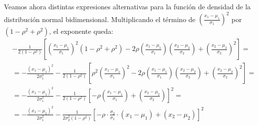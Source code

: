 Veamos ahora distintas expresiones alternativas para la función de densidad de la distribución normal bidimensional.
Multiplicando el término de $\left(\frac{x_1-\mu_1}{\sigma_1}\right)^2$ por $(1-\rho^2+\rho^2)$, el exponente queda:
\begin{align*}
    &-\frac{1}{2(1-\rho^2)}\left[\left(\frac{x_1-\mu_1}{\sigma_1}\right)^2(1-\rho^2+\rho^2)-2\rho\left(\frac{x_1-\mu_1}{\sigma_1}\right)\left(\frac{x_2-\mu_2}{\sigma_2}\right)+\left(\frac{x_2-\mu_2}{\sigma_2}\right)^2\right]
    =\\&= -\frac{\left(x_1-\mu_1\right)^2}{2\sigma_1^2}-\frac{1}{2(1-\rho^2)}\left[\rho^2\left(\frac{x_1-\mu_1}{\sigma_1}\right)^2-2\rho\left(\frac{x_1-\mu_1}{\sigma_1}\right)\left(\frac{x_2-\mu_2}{\sigma_2}\right)+\left(\frac{x_2-\mu_2}{\sigma_2}\right)^2\right]
    =\\&= -\frac{\left(x_1-\mu_1\right)^2}{2\sigma_1^2}-\frac{1}{2(1-\rho^2)}\left[-\rho\left(\frac{x_1-\mu_1}{\sigma_1}\right)+\left(\frac{x_2-\mu_2}{\sigma_2}\right)\right]^2
    =\\&= -\frac{\left(x_1-\mu_1\right)^2}{2\sigma_1^2}-\frac{1}{2\sigma_2^2(1-\rho^2)}\left[-\rho\cdot \frac{\sigma_2}{\sigma_1}\cdot (x_1-\mu_1)+ (x_2-\mu_2)\right]^2
\end{align*}

